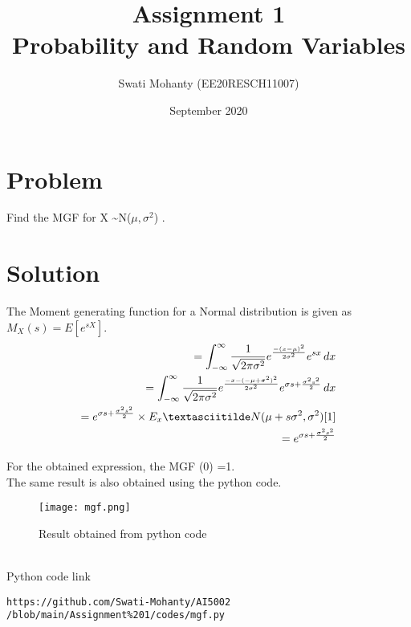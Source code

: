 \documentclass[journal,12pt,twocolumn]{IEEEtran}
\title{Assignment 1
\\Probability and Random Variables }
\author{Swati Mohanty (EE20RESCH11007) }
\date{September 2020}
\begin{document}
\maketitle


\section{Problem}
Find the MGF for X \textasciitilde N(${\mu,\sigma^2}$)
.
\section{Solution}
The Moment generating function for a Normal distribution is given as ${M_X(s) = E[e^{sX}]}$.
\begin{align}
    = \int_{-\infty}^{\infty} \frac{1}{\sqrt{2\pi\sigma^2}}e^{\frac{-(x-\mu)^2}{2\sigma^2}}e^{ sx} \,dx 
    \\ = \int_{-\infty}^{\infty} \frac{1}{\sqrt{2\pi\sigma^2}}e^{\frac{-x-
    (-\mu+\sigma^2)^2}{2\sigma^2}}e^{ \sigma s + \frac{\sigma^2 s^2}{2}} \,dx 
    \\ = e^{ \sigma s + \frac{\sigma^2 s^2}{2}} \times E_x \textasciitilde N(\mu+ s\sigma^2 ,\sigma^2)[1]
    \\= e^{ \sigma s + \frac{\sigma^2 s^2}{2}}
\end{align}

For the obtained expression, the MGF (0) =1.
\\The same result is also obtained using the python code.
\begin{figure}[h]
\renewcommand{\theenumi}{1}
\centering
\texttt{[image: mgf.png]}
\caption{Result obtained from python code }
\label{Fig:1}
\end{figure}
\\Python code link 
\begin{lstlisting}
https://github.com/Swati-Mohanty/AI5002
/blob/main/Assignment%201/codes/mgf.py
\end{lstlisting}
\end{document}
